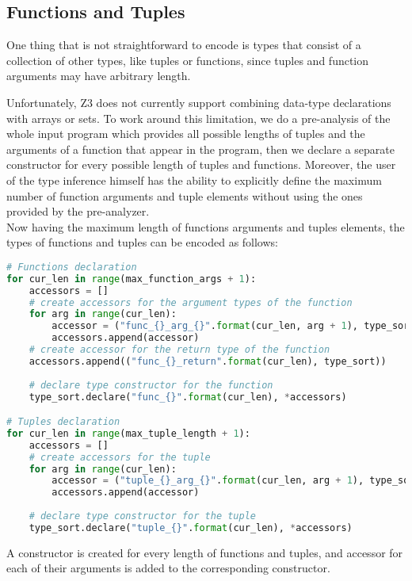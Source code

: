 \subsection{Functions and Tuples}
One thing that is not straightforward to encode is types that consist of a collection of other types, like tuples or functions, since tuples and function arguments may have arbitrary length.

Unfortunately, Z3 does not currently support combining data-type declarations with arrays or sets. To work around this limitation, we do a pre-analysis of the whole input program which provides all possible lengths of tuples and the arguments of a function that appear in the program, then we declare a separate constructor for every possible length of tuples and functions. Moreover, the user of the type inference himself has the ability to explicitly define the maximum number of function arguments and tuple elements without using the ones provided by the pre-analyzer.\\

Now having the maximum length of functions arguments and tuples elements, the types of functions and tuples can be encoded as follows:

\begin{lstlisting}[language=python]
# Functions declaration
for cur_len in range(max_function_args + 1):
    accessors = []
    # create accessors for the argument types of the function
    for arg in range(cur_len):
	    accessor = ("func_{}_arg_{}".format(cur_len, arg + 1), type_sort)
	    accessors.append(accessor)
    # create accessor for the return type of the function
    accessors.append(("func_{}_return".format(cur_len), type_sort))
    
    # declare type constructor for the function
    type_sort.declare("func_{}".format(cur_len), *accessors)

# Tuples declaration
for cur_len in range(max_tuple_length + 1):
    accessors = []
    # create accessors for the tuple
    for arg in range(cur_len):
		accessor = ("tuple_{}_arg_{}".format(cur_len, arg + 1), type_sort)
	    accessors.append(accessor)
	    
    # declare type constructor for the tuple
    type_sort.declare("tuple_{}".format(cur_len), *accessors)
\end{lstlisting}

A constructor is created for every length of functions and tuples, and accessor for each of their arguments is added to the corresponding constructor.

